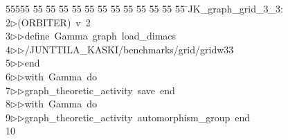 %
%
\begin{tabbing}
55555 \= 55 \= 55 \= 55 \= 55 \= 55 \= 55 \= 55 \= 55 \= 55 \= 55 \= 55 \= 55 \= \>JK\_graph\_grid\_3\_3:\\[0pt]
2\>$\triangleright$\>(ORBITER)\ v\ 2\ \\[0pt]
3\>$\triangleright$\>$\triangleright$\>define\ Gamma\ graph\ load\_dimacs\ \\[0pt]
4\>$\triangleright$\>$\triangleright$\>/JUNTTILA\_KASKI/benchmarks/grid/gridw33\ \\[0pt]
5\>$\triangleright$\>$\triangleright$\>end\ \\[0pt]
6\>$\triangleright$\>$\triangleright$\>with\ Gamma\ do\ \\[0pt]
7\>$\triangleright$\>$\triangleright$\>graph\_theoretic\_activity\ save\ end\ \\[0pt]
8\>$\triangleright$\>$\triangleright$\>with\ Gamma\ do\ \\[0pt]
9\>$\triangleright$\>$\triangleright$\>graph\_theoretic\_activity\ automorphism\_group\ end\ \\[0pt]
10\>\end{tabbing}
